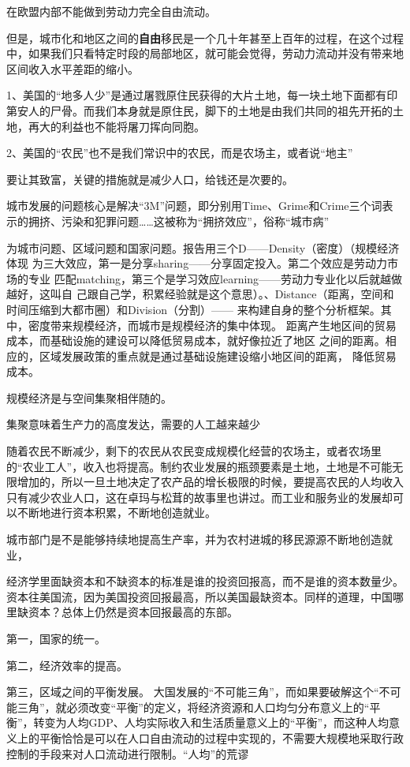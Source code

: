 在欧盟内部不能做到劳动力完全自由流动。


但是，城市化和地区之间的{\bf 自由}移民是一个几十年甚至上百年的过程，在这个过程中，如果我们只看特定时段的局部地区，就可能会觉得，劳动力流动并没有带来地区间收入水平差距的缩小。

1、美国的“地多人少”是通过屠戮原住民获得的大片土地，每一块土地下面都有印第安人的尸骨。而我们本身就是原住民，脚下的土地是由我们共同的祖先开拓的土地，再大的利益也不能将屠刀挥向同胞。

2、美国的“农民”也不是我们常识中的农民，而是农场主，或者说“地主”

要让其致富，关键的措施就是减少人口，给钱还是次要的。

城市发展的问题核心是解决“3M”问题，即分别用Time、Grime和Crime三个词表示的拥挤、污染和犯罪问题……这被称为“拥挤效应”，俗称“城市病”

为城市问题、区域问题和国家问题。报告用三个D——Density（密度）（规模经济体现
为三大效应，第一是分享sharing——分享固定投入。第二个效应是劳动力市场的专业
匹配matching，第三个是学习效应learning——劳动力专业化以后就越做越好，这叫自
己跟自己学，积累经验就是这个意思）。、Distance（距离，空间和时间压缩到大都市圈）和Division（分割）——
来构建自身的整个分析框架。其中，密度带来规模经济，而城市是规模经济的集中体现。
距离产生地区间的贸易成本，而基础设施的建设可以降低贸易成本，就好像拉近了地区
之间的距离。相应的，区域发展政策的重点就是通过基础设施建设缩小地区间的距离，
降低贸易成本。

规模经济是与空间集聚相伴随的。

集聚意味着生产力的高度发达，需要的人工越来越少

随着农民不断减少，剩下的农民从农民变成规模化经营的农场主，或者农场里的“农业工人”，收入也将提高。制约农业发展的瓶颈要素是土地，土地是不可能无限增加的，所以一旦土地决定了农产品的增长极限的时候，要提高农民的人均收入只有减少农业人口，这在卓玛与松茸的故事里也讲过。而工业和服务业的发展却可以不断地进行资本积累，不断地创造就业。

城市部门是不是能够持续地提高生产率，并为农村进城的移民源源不断地创造就业，

经济学里面缺资本和不缺资本的标准是谁的投资回报高，而不是谁的资本数量少。资本往美国流，因为美国投资回报最高，所以美国最缺资本。同样的道理，中国哪里缺资本？总体上仍然是资本回报最高的东部。

第一，国家的统一。

第二，经济效率的提高。

第三，区域之间的平衡发展。
大国发展的“不可能三角”，而如果要破解这个“不可能三角”，就必须改变“平衡”的定义，将经济资源和人口均匀分布意义上的“平衡”，转变为人均GDP、人均实际收入和生活质量意义上的“平衡”，而这种人均意义上的平衡恰恰是可以在人口自由流动的过程中实现的，不需要大规模地采取行政控制的手段来对人口流动进行限制。“人均”的荒谬


